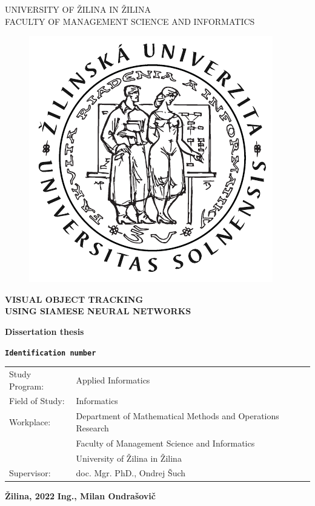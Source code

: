\begin{titlepage}
    \begin{center}
        \normalsize
        UNIVERSITY OF ŽILINA IN ŽILINA\\
        FACULTY OF MANAGEMENT SCIENCE AND INFORMATICS\\

        \begin{figure}[!h]
            \centerline{\includegraphics[width=0.25\linewidth]{figures/formal_pages/FRI_logo.pdf}}
        \end{figure}

        \vfill

        \Large
        \textbf{VISUAL OBJECT TRACKING\\USING SIAMESE NEURAL NETWORKS}

        \textbf{Dissertation thesis}
        \large

        \textbf{\texttt{Identification number}}
    \end{center}

    \vfill

    \small

    \begin{tabular}{ll}
        Study Program:  & Applied Informatics                                        \\[-2ex]
        Field of Study: & Informatics                                                \\[-2ex]
        Workplace:      & Department of Mathematical Methods and Operations Research \\[-2ex]
                        & Faculty of Management Science and Informatics              \\[-2ex]
                        & University of Žilina in Žilina                             \\[-2ex]
        Supervisor:     & doc. Mgr. PhD., Ondrej Šuch                                \\[-2ex]
    \end{tabular}

    \normalsize

    \vfill

    \textbf{Žilina, 2022} \hfill \textbf{Ing., Milan Ondrašovič}

\end{titlepage}